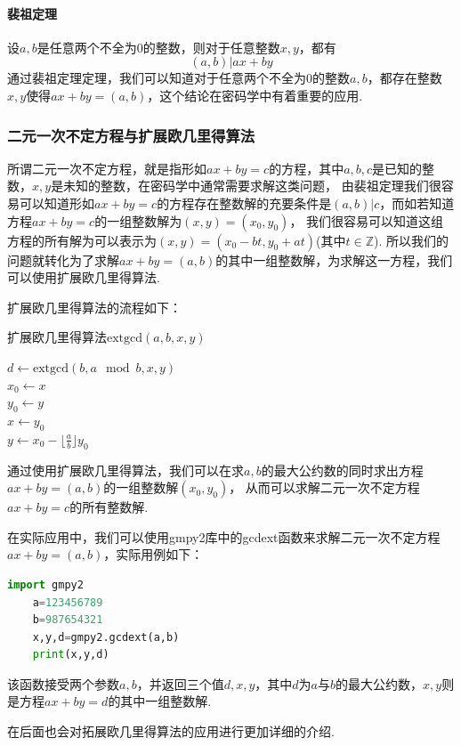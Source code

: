 \documentclass{article}
\numberwithin{equation}{subsubsection}
\begin{document}
\paragraph{\textbf{裴祖定理}}
设$a,b$是任意两个不全为$0$的整数，则对于任意整数$x,y$，都有
\begin{equation}
    (a,b)|ax+by
    \nonumber
\end{equation}
通过裴祖定理定理，我们可以知道对于任意两个不全为$0$的整数$a,b$，都存在整数$x,y$使得$ax+by=(a,b)$，这个结论在密码学中有着重要的应用.\par

\subsubsection{二元一次不定方程与扩展欧几里得算法}
所谓二元一次不定方程，就是指形如$ax+by=c$的方程，其中$a,b,c$是已知的整数，$x,y$是未知的整数，在密码学中通常需要求解这类问题，
由裴祖定理我们很容易可以知道形如$ax+by=c$的方程存在整数解的充要条件是$(a,b)|c$，而如若知道方程$ax+by=c$的一组整数解为$(x,y)=(x_0,y_0)$，
我们很容易可以知道这组方程的所有解为可以表示为$(x,y)=(x_0-bt,y_0+at)$(其中$t\in \mathbb{Z}$).
所以我们的问题就转化为了求解$ax+by=(a,b)$的其中一组整数解，为求解这一方程，我们可以使用扩展欧几里得算法.\par
扩展欧几里得算法的流程如下：
\begin{algorithm}
    \caption{扩展欧几里得算法$\text{extgcd}(a,b,x,y)$}
    $d\leftarrow \text{extgcd}(b,a\mod b,x,y)$\\
    $x_0\leftarrow x$\\
    $y_0\leftarrow y$\\
    $x\leftarrow y_0$\\
    $y\leftarrow x_0-\lfloor \frac{a}{b}\rfloor y_0$\\
\end{algorithm}\par
通过使用扩展欧几里得算法，我们可以在求$a,b$的最大公约数的同时求出方程$ax+by=(a,b)$的一组整数解$(x_0,y_0)$，
从而可以求解二元一次不定方程$ax+by=c$的所有整数解.\par
在实际应用中，我们可以使用gmpy2库中的gcdext函数来求解二元一次不定方程$ax+by=(a,b)$，实际用例如下：
\begin{lstlisting}[language=Python,basicstyle=\ttfamily,breaklines=true,keywordstyle=\bfseries\color{blue}]
    import gmpy2
    a=123456789
    b=987654321
    x,y,d=gmpy2.gcdext(a,b)
    print(x,y,d)
\end{lstlisting}
该函数接受两个参数$a,b$，并返回三个值$d,x,y$，其中$d$为$a$与$b$的最大公约数，$x,y$则是方程$ax+by=d$的其中一组整数解.\par
在后面也会对拓展欧几里得算法的应用进行更加详细的介绍.\par
\end{document}
